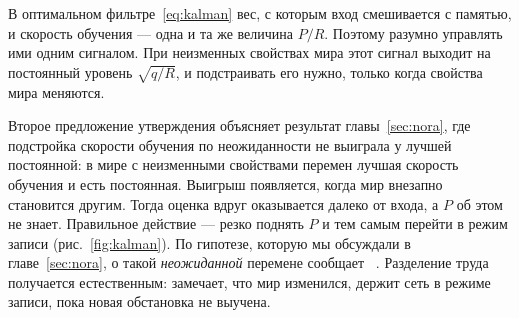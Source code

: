 \begin{keyblock}
\begin{proposition}
\label{prop:kalman}
В оптимальном фильтре~\eqref{eq:kalman} вес, с которым вход смешивается с памятью, и скорость обучения --- одна и та же величина $P/R$. Поэтому разумно управлять ими одним сигналом. При неизменных свойствах мира этот сигнал выходит на постоянный уровень $\sqrt{q/R}$, и подстраивать его нужно, только когда свойства мира меняются.
\end{proposition}
\end{keyblock}

Второе предложение утверждения объясняет результат главы~\ref{sec:nora}, где подстройка скорости обучения по неожиданности не выиграла у лучшей постоянной: в мире с неизменными свойствами перемен лучшая скорость обучения и есть постоянная. Выигрыш появляется, когда мир внезапно становится другим. Тогда оценка вдруг оказывается далеко от входа, а $P$ об этом не знает. Правильное действие --- резко поднять $P$ и тем самым перейти в режим записи (рис.~\ref{fig:kalman}). По гипотезе, которую мы обсуждали в главе~\ref{sec:nora}, о такой \emph{неожиданной} перемене сообщает ~\cite{YuDayan2005}. Разделение труда получается естественным:  замечает, что мир изменился,  держит сеть в режиме записи, пока новая обстановка не выучена.

